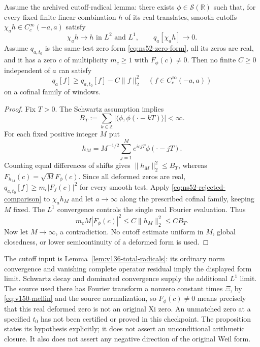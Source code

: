\begin{proposition}\label{prop:ns52-unmatched}
Assume the archived cutoff-radical lemma: there exists
$\phi\in\mathcal S(\mathbb R)$ such that, for every fixed finite
linear combination $h$ of its real translates, smooth cutoffs
$\chi_a h\in C_c^\infty(-a,a)$ satisfy
\[
 \chi_a h\longrightarrow h\text{ in }L^2\text{ and }L^1,
 \qquad q_a[\chi_a h]\longrightarrow0.
\]
Assume $q_{a,t_0}$ is the same-test zero form
\eqref{eq:ns52-zero-form}, all its zeros are real, and it has a
zero $c$ of multiplicity $m_c\ge1$ with $F_\phi(c)\ne0$.
Then no finite $C\ge0$ independent of $a$ can satisfy
\begin{equation}\label{eq:ns52-rejected-comparison}
 q_a[f]\ge q_{a,t_0}[f]-C\|f\|_2^2
 \quad(f\in C_c^\infty(-a,a))
\end{equation}
on a cofinal family of windows.
\end{proposition}
\begin{proof}
Fix $T>0$. The Schwartz assumption implies
\[
 B_T:=\sum_{k\in\mathbb Z}
       |\langle\phi,\phi(\cdot-kT)\rangle|<\infty.
\]
For each fixed positive integer $M$ put
\[
 h_M=M^{-1/2}\sum_{j=1}^M e^{icjT}\phi(\cdot-jT).
\]
Counting equal differences of shifts gives
$\|h_M\|_2^2\le B_T$, whereas
$F_{h_M}(c)=\sqrt M F_\phi(c)$.
Since all deformed zeros are real,
$q_{a,t_0}[f]\ge m_c|F_f(c)|^2$ for every smooth test.
Apply \eqref{eq:ns52-rejected-comparison} to $\chi_a h_M$ and
let $a\to\infty$ along the prescribed cofinal family, keeping $M$
fixed. The $L^1$ convergence controls the single real Fourier
evaluation. Thus
\[
 m_c M|F_\phi(c)|^2\le C\|h_M\|_2^2\le CB_T.
\]
Now let $M\to\infty$, a contradiction. No cutoff estimate uniform
in $M$, global closedness, or lower semicontinuity of a deformed
form is used.
\end{proof}

The cutoff input is Lemma~\ref{lem:v136-total-radicals}: its ordinary
norm convergence and vanishing complete operator residual imply the
displayed form limit. Schwartz decay and dominated convergence supply
the additional $L^1$ limit. The source used there has Fourier transform
a nonzero constant times $\Xi$, by \eqref{eq:v150-mellin} and the
source normalization, so $F_\phi(c)\ne0$ means precisely that this
real deformed zero is not an original Xi zero. An unmatched zero
at a specified $t_0$ has not been certified or proved in this
checkpoint. The proposition states its hypothesis explicitly; it
does not assert an unconditional arithmetic closure. It also does
not assert any negative direction of the original Weil form.

